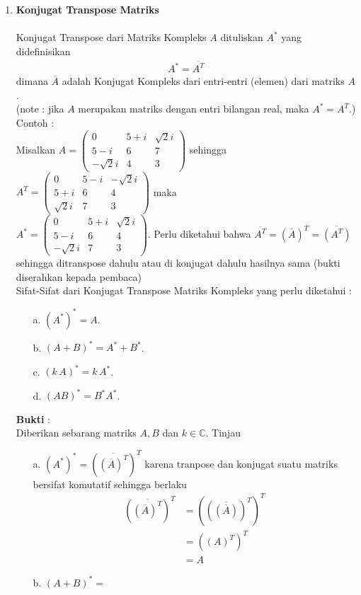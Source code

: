 \documentclass[11pt,a4paper]{article}
\theoremstyle{plain}
\theoremstyle{definition}
\theoremstyle{remark}
\begin{document}
\begin{enumerate}
	
	\item \textbf{Konjugat Transpose Matriks}\\
	\\
	\hspace*{0.5cm} Konjugat Transpose dari Matriks Kompleks $A$ dituliskan $A^*$ yang didefinisikan
	\begin{align*}
	\displaystyle A^*=\overline{A^{T}}
	\end{align*}
	dimana $\overline{A}$ adalah Konjugat Kompleks dari entri-entri (elemen) dari matriks $A$.\\
	(note : jika $A$ merupakan matriks dengan entri bilangan real, maka $A^*=A^{T}$.)
	Contoh :\\
	Misalkan $A=\begin{pmatrix}
	0 & 5+i & \sqrt{2}i\\ 
	5-i & 6 & 7\\ 
	-\sqrt{2}i & 4 & 3
	\end{pmatrix}$ sehingga $A^{T}=\begin{pmatrix}
	0 & 5-i & -\sqrt{2}i\\ 
	5+i & 6 & 4\\ 
	\sqrt{2}i & 7 & 3
	\end{pmatrix}$ maka\\
	$A^*=\begin{pmatrix}
	0 & 5+i & \sqrt{2}i\\ 
	5-i & 6 & 4\\ 
	-\sqrt{2}i & 7 & 3
	\end{pmatrix}$. 
	Perlu diketahui bahwa $\overline{A^{T}}=\left(\overline{A}\right)^{T}=\overline{\left(A^{T}\right)}$ sehingga ditranspose dahulu atau di konjugat dahulu hasilnya sama (bukti diserahkan kepada pembaca)\\
	
	Sifat-Sifat dari Konjugat Transpose Matriks Kompleks yang perlu diketahui :
	\begin{enumerate}
		\item[a.] $\left(A^*\right)^*=A$.
		\item[b.] $\left(A+B\right)^*=A^*+B^*$.
		\item[c.] $\left(k\, A\right)^*=k\, A^*$.
		\item[d.] $\left(AB\right)^*=B^*A^*$.
	\end{enumerate}
	\textbf{Bukti} :\\
	Diberikan sebarang matriks $A,B$ dan $k\in \mathbb{C}$. Tinjau
	\begin{enumerate}
		\item[a.] $(A^*)^*=\left(\overline{\left(\overline{A}\right)^{T}}\right)^{T}$ karena tranpose dan konjugat suatu matriks bersifat komutatif sehingga berlaku
		\begin{align*}
		\left(\overline{\left(\overline{A}\right)^{T}}\right)^{T} &= \left(\left(\overline{\left(\overline{A}\right)}\right)^{T}\right)^{T} \\
		&= \left(\left(A\right)^{T}\right)^{T} \\
		&= A
		\end{align*}
		\item[b.] $\left( A+B\right)^* = $
	\end{enumerate}
	

\end{enumerate}
\end{document}
